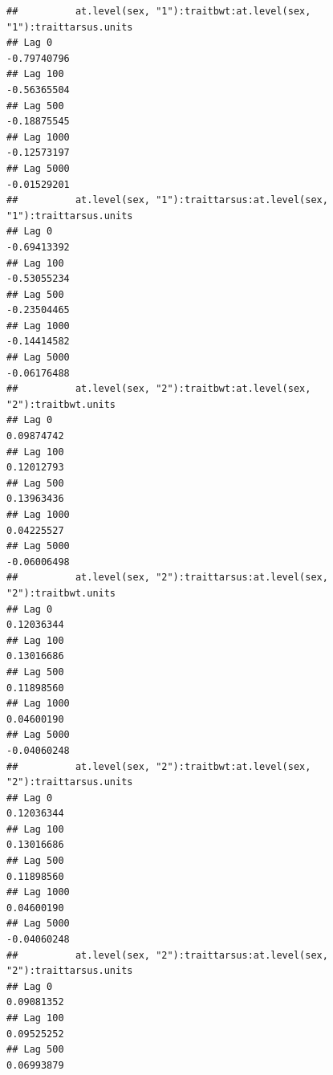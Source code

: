 \documentclass[
  12pt,
]{book}
\begin{document}
\begin{verbatim}
##          at.level(sex, "1"):traitbwt:at.level(sex, "1"):traittarsus.units
## Lag 0                                                         -0.79740796
## Lag 100                                                       -0.56365504
## Lag 500                                                       -0.18875545
## Lag 1000                                                      -0.12573197
## Lag 5000                                                      -0.01529201
##          at.level(sex, "1"):traittarsus:at.level(sex, "1"):traittarsus.units
## Lag 0                                                            -0.69413392
## Lag 100                                                          -0.53055234
## Lag 500                                                          -0.23504465
## Lag 1000                                                         -0.14414582
## Lag 5000                                                         -0.06176488
##          at.level(sex, "2"):traitbwt:at.level(sex, "2"):traitbwt.units
## Lag 0                                                       0.09874742
## Lag 100                                                     0.12012793
## Lag 500                                                     0.13963436
## Lag 1000                                                    0.04225527
## Lag 5000                                                   -0.06006498
##          at.level(sex, "2"):traittarsus:at.level(sex, "2"):traitbwt.units
## Lag 0                                                          0.12036344
## Lag 100                                                        0.13016686
## Lag 500                                                        0.11898560
## Lag 1000                                                       0.04600190
## Lag 5000                                                      -0.04060248
##          at.level(sex, "2"):traitbwt:at.level(sex, "2"):traittarsus.units
## Lag 0                                                          0.12036344
## Lag 100                                                        0.13016686
## Lag 500                                                        0.11898560
## Lag 1000                                                       0.04600190
## Lag 5000                                                      -0.04060248
##          at.level(sex, "2"):traittarsus:at.level(sex, "2"):traittarsus.units
## Lag 0                                                             0.09081352
## Lag 100                                                           0.09525252
## Lag 500                                                           0.06993879

\end{verbatim}
\end{document}
